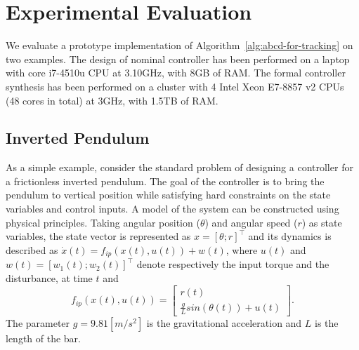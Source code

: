 
\section{Experimental Evaluation}\label{sec:experiments}
We evaluate a prototype implementation of Algorithm~\ref{alg:abcd-for-tracking}
on two examples. 
The design of nominal controller has been performed on a laptop with core i7-4510u CPU at 3.10GHz, with 8GB of
RAM.
The formal controller synthesis has been performed
on a cluster with 4 Intel Xeon E7-8857 v2 CPUs (48 cores in total) at 3GHz, with 1.5TB of
RAM.
\subsection{Inverted Pendulum}\label{subsec:invpend}
As a simple example, consider the standard problem of designing a controller for a frictionless inverted pendulum.
The goal of the controller is to bring the pendulum to vertical position while satisfying hard constraints on the state variables and control inputs.
A model of the system can be constructed using physical principles. Taking angular position ($\theta$) and angular speed ($r$) as state variables, the state vector is represented as $x=[\theta;r]^\top$ and its dynamics is described as $\dot x(t)=f_{ip}(x(t),u(t))+w(t)$, where $u(t)$ and $w(t)=[w_1(t);w_2(t)]^\top$ denote respectively the input torque and the disturbance, at time $t$ and
\begin{equation}\label{eq:inv_pend_ss}
	f_{ip}(x(t),u(t))=\begin{bmatrix}r(t)\\\frac{g}{L}sin(\theta(t))+u(t)\end{bmatrix}.
\end{equation}
The parameter $g=9.81 [m/s^2]$ is the gravitational acceleration
and $L$ is the length of the bar. 

